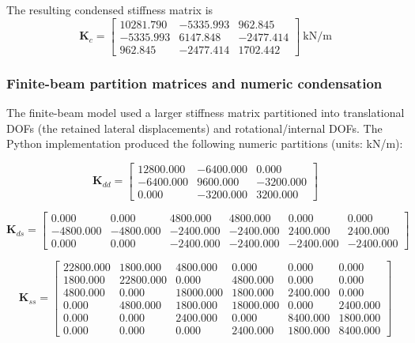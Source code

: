 \documentclass[11pt,a4paper]{article}
\begin{document}
The resulting condensed stiffness matrix is
\begin{equation}
\boxed{
\bm{K}_c=
\begin{bmatrix}
10281.790 & -5335.993 & 962.845\\
-5335.993 & 6147.848 & -2477.414\\
962.845 & -2477.414 & 1702.442
\end{bmatrix}\ \mathrm{kN/m}
}
\label{eq:Kc}
\end{equation}

\subsubsection*{Finite-beam partition matrices and numeric condensation}
The finite-beam model used a larger stiffness matrix partitioned into translational DOFs (the retained lateral displacements) and rotational/internal DOFs. The Python implementation produced the following numeric partitions (units: kN/m):

\begin{equation}
\bm{K}_{dd}=\begin{bmatrix}
12800.000 & -6400.000 & 0.000\\
-6400.000 & 9600.000 & -3200.000\\
0.000 & -3200.000 & 3200.000
\end{bmatrix}
\end{equation}

\begin{equation}
\bm{K}_{ds}=\begin{bmatrix}
0.000 & 0.000 & 4800.000 & 4800.000 & 0.000 & 0.000\\
-4800.000 & -4800.000 & -2400.000 & -2400.000 & 2400.000 & 2400.000\\
0.000 & 0.000 & -2400.000 & -2400.000 & -2400.000 & -2400.000
\end{bmatrix}
\end{equation}

\begin{equation}
\bm{K}_{ss}=\begin{bmatrix}
22800.000 & 1800.000 & 4800.000 & 0.000 & 0.000 & 0.000\\
1800.000 & 22800.000 & 0.000 & 4800.000 & 0.000 & 0.000\\
4800.000 & 0.000 & 18000.000 & 1800.000 & 2400.000 & 0.000\\
0.000 & 4800.000 & 1800.000 & 18000.000 & 0.000 & 2400.000\\
0.000 & 0.000 & 2400.000 & 0.000 & 8400.000 & 1800.000\\
0.000 & 0.000 & 0.000 & 2400.000 & 1800.000 & 8400.000
\end{bmatrix}
\end{equation}
\end{document}
